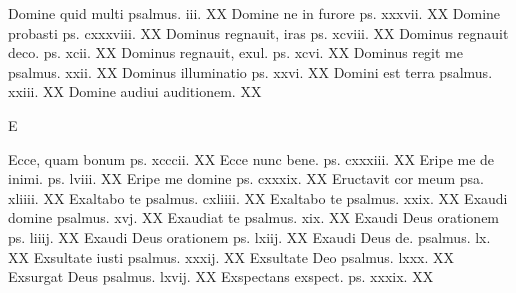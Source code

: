 \documentclass[a5paper,10pt]{book}
\begin{document}
\begin{multicols}{2}
\newline Domine quid multi psalmus. iii. \hfill XX
\newline Domine ne in furore ps. xxxvii. \hfill XX
\newline Domine probasti ps. cxxxviii. \hfill XX
\newline Dominus regnauit, iras ps. xcviii. \hfill XX
\newline Dominus regnauit deco. ps. xcii. \hfill XX
\newline Dominus regnauit, exul. ps. xcvi. \hfill XX
\newline Dominus regit me psalmus. xxii. \hfill XX
\newline Dominus illuminatio ps. xxvi. \hfill XX
\newline Domini est terra psalmus. xxiii. \hfill XX
\newline Domine audiui auditionem. \hfill XX
\newline \vspace{-1.75em}
\begin{center}
\color{red} E
\end{center}
\vspace{-.75em}
\par \noindent Ecce, quam bonum ps. xcccii. \hfill XX
\newline Ecce nunc bene. ps. cxxxiii. \hfill XX
\newline Eripe me de inimi. ps. lviii. \hfill XX
\newline Eripe me domine ps. cxxxix. \hfill XX
\newline Eructavit cor meum psa. xliiii. \hfill XX
\newline Exaltabo te psalmus. cxliiii. \hfill XX
\newline Exaltabo te psalmus. xxix. \hfill XX
\newline Exaudi domine psalmus. xvj. \hfill XX
\newline Exaudiat te psalmus. xix. \hfill XX
\newline Exaudi Deus orationem ps. liiij. \hfill XX
\newline Exaudi Deus orationem ps. lxiij. \hfill XX
\newline Exaudi Deus de. psalmus. lx. \hfill XX
\newline Exsultate iusti psalmus. xxxij. \hfill XX
\newline Exsultate Deo psalmus. lxxx. \hfill XX
\newline Exsurgat Deus psalmus. lxvij. \hfill XX
\newline Exspectans exspect. ps. xxxix. \hfill XX

\end{multicols}
\end{document}
